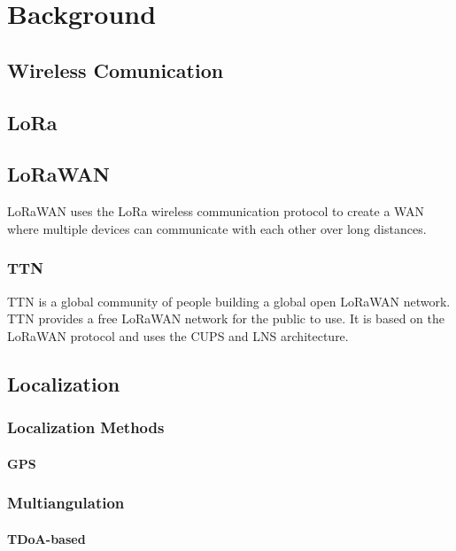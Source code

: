 \chapter{Background}

\section{Wireless Comunication}
\section{\acf{LoRa}}

\section{\acf{LoRaWAN}}

\ac{LoRaWAN} uses the LoRa wireless communication protocol to create a \ac{WAN} where multiple devices can communicate with each other over long distances.

\subsection{\acf{TTN}}

\ac{TTN} is a global community of people building a global open \ac{LoRaWAN} network. \ac{TTN} provides a free \ac{LoRaWAN} network for the public to use. It is based on the \ac{LoRaWAN} protocol and uses the \ac{CUPS} and \ac{LNS} architecture.


\section{Localization}

\subsection{Localization Methods}

\subsubsection{\ac{GPS}}

\subsection{Multiangulation}

\subsubsection{\ac{TDoA}-based}

